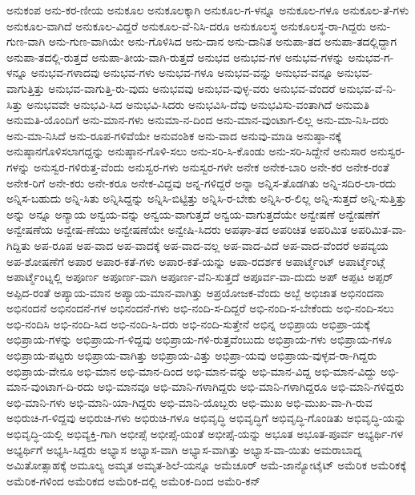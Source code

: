 {ಅನುಕಂಪ
ಅನು-ಕರ-ಣೀಯ
ಅನುಕೂಲ
ಅನುಕೂಲಕ್ಕಾಗಿ
ಅನುಕೂಲ-ಗ-ಳನ್ನೂ
ಅನುಕೂಲ-ಗಳೂ
ಅನುಕೂಲ-ತೆ-ಗಳು
ಅನುಕೂಲ-ವಾಗಿದೆ
ಅನುಕೂಲ-ವಿದ್ದರೆ
ಅನುಕೂಲ-ವೆ-ನಿಸಿ-ದರೂ
ಅನುಕೂಲಸ್ಥ
ಅನುಕೂಲಸ್ಥ-ರಾ-ಗಿದ್ದರು
ಅನು-ಗುಣ-ವಾಗಿ
ಅನು-ಗುಣ-ವಾಗಿಯೇ
ಅನು-ಗೊಳಿಸಿದ
ಅನು-ದಾನ
ಅನು-ದಾನಿತ
ಅನುಪಾ-ತದ
ಅನುಪಾ-ತದಲ್ಲಿದ್ದಾಗ
ಅನುಪಾ-ತದಲ್ಲಿ-ರುತ್ತದೆ
ಅನುಪಾ-ತೀಯ-ವಾಗಿ-ರುತ್ತದೆ
ಅನುಭವ
ಅನುಭವ-ಗಳ
ಅನುಭವ-ಗಳನ್ನು
ಅನುಭವ-ಗ-ಳನ್ನೂ
ಅನುಭವ-ಗಳಾದವು
ಅನುಭವ-ಗಳು
ಅನುಭವ-ಗಳೂ
ಅನುಭವ-ವನ್ನು
ಅನುಭವ-ವನ್ನೂ
ಅನುಭವ-ವಾಗುತ್ತಿತ್ತು
ಅನುಭವ-ವಾಗುತ್ತಿ-ರು-ವುದು
ಅನುಭವವು
ಅನುಭವ-ವುಳ್ಳ-ವರು
ಅನುಭವ-ವೆಂದರೆ
ಅನುಭವ-ವೆ-ನಿ-ಸಿತ್ತು
ಅನುಭವವೇ
ಅನುಭವಿ-ಸಿದ
ಅನುಭವಿ-ಸಿದರು
ಅನುಭವಿಸಿ-ದೆವು
ಅನುಭವಿಸು-ವಂತಾಗಿದೆ
ಅನುಮತಿ
ಅನುಮತಿ-ಯೊಂದಿಗೆ
ಅನು-ಮಾನ-ಗಳು
ಅನುಮಾ-ನ-ದಿಂದ
ಅನು-ಮಾನ-ವುಂಟಾಗ-ಲಿಲ್ಲ
ಅನು-ಮಾ-ನಿಸಿ-ದರು
ಅನು-ಮಾ-ನಿಸಿದೆ
ಅನು-ರೂಪ-ಗಳಿವೆಯೇ
ಅನುವಂಶಿಕ
ಅನು-ವಾದ
ಅನುವು-ಮಾಡಿ
ಅನುಷ್ಠಾ-ನಕ್ಕೆ
ಅನುಷ್ಠಾನಗೊಳಿಸಲಾಗದ್ದನ್ನು
ಅನುಷ್ಠಾನ-ಗೊಳಿ-ಸಲು
ಅನು-ಸರಿ-ಸಿ-ಕೊಂಡು
ಅನು-ಸರಿ-ಸಿದ್ದೇನೆ
ಅನುಸಾರ
ಅನುಸ್ವರ-ಗಳನ್ನು
ಅನುಸ್ವರ-ಗಳಿರುತ್ತ-ವೆಂದು
ಅನುಸ್ವರ-ಗಳು
ಅನುಸ್ವರ-ಗಳೇ
ಅನೇಕ
ಅನೇಕ-ಬಾರಿ
ಅನೇ-ಕರ
ಅನೇಕ-ರಂತೆ
ಅನೇಕ-ರಿಗೆ
ಅನೇ-ಕರು
ಅನೇ-ಕರೂ
ಅನೇಕ-ವಿದ್ದವು
ಅನ್ನ-ಗಳಿದ್ದರೆ
ಅನ್ನಾ
ಅನ್ನಿಸ-ತೊಡಗಿತು
ಅನ್ನಿ-ಸದಿರ-ಲಾ-ರದು
ಅನ್ನಿಸ-ಬಹುದು
ಅನ್ನಿ-ಸಿತು
ಅನ್ನಿಸಿದ್ದನ್ನು
ಅನ್ನಿಸಿ-ಬಿಟ್ಟಿತ್ತು
ಅನ್ನಿಸಿ-ರ-ಬೇಕು
ಅನ್ನಿಸಿ-ರ-ಲಿಲ್ಲ
ಅನ್ನಿ-ಸುತ್ತದೆ
ಅನ್ನಿ-ಸುತ್ತಿತ್ತು
ಅನ್ನು
ಅನ್ನೂ
ಅನ್ಯಾಯ
ಅನ್ವಯ-ವನ್ನು
ಅನ್ವಯ-ವಾಗುತ್ತದೆ
ಅನ್ವಯ-ವಾಗುತ್ತದೆಯೇ
ಅನ್ವೇಷಣೆ
ಅನ್ವೇಷಣೆಗೆ
ಅನ್ವೇಷಣೆಯ
ಅನ್ವೇಷ-ಣೆಯು
ಅನ್ವೇಷಣೆಯೇ
ಅನ್ವೇಷಿ-ಸಿದರು
ಅಪಘಾ-ತದ
ಅಪರಿಚಿತ
ಅಪರಿಮಿತ
ಅಪರಿಮಿತ-ವಾ-ಗಿದ್ದಿತು
ಅಪ-ರೂಪ
ಅಪ-ವಾದ
ಅಪ-ವಾದಕ್ಕೆ
ಅಪ-ವಾದ-ವಲ್ಲ
ಅಪ-ವಾದ-ವಿದೆ
ಅಪ-ವಾದ-ವೆಂದರೆ
ಅಪವ್ಯಯ
ಅಪ-ಶೋಷಣೆಗೆ
ಅಪಾರ
ಅಪಾರ-ಕತೆ-ಗಳು
ಅಪಾರ-ಕತೆ-ಯನ್ನು
ಅಪಾ-ರದರ್ಶಕ
ಅಪಾರ್ಟ್ಮೆಂಟ್
ಅಪಾರ್ಟ್ಮೆಂಟ್ಗೆ
ಅಪಾರ್ಟ್ಮೆಂಟ್ನಲ್ಲಿ
ಅಪೂರ್ಣ
ಅಪೂರ್ಣ-ವಾಗಿ
ಅಪೂರ್ಣ-ವೆನಿ-ಸುತ್ತದೆ
ಅಪೂರ್ವ-ವಾ-ದುದು
ಅಪ್
ಅಪ್ಪಟ
ಅಪ್ಪರ್
ಅಪ್ಪಿದ-ರಂತೆ
ಅಪ್ಯಾಯ-ಮಾನ
ಅಪ್ಯಾಯ-ಮಾನ-ವಾಗಿತ್ತು
ಅಪ್ರಯೋಜಕ-ವೆಂದು
ಅಬ್ಬೆ
ಅಭಿಜಾತ
ಅಭಿನಂದನಾ
ಅಭಿನಂದನೆ
ಅಭಿನಂದನೆ-ಗಳ
ಅಭಿನಂದನೆ-ಗಳು
ಅಭಿ-ನಂದಿ-ಸ-ದಿದ್ದರೆ
ಅಭಿ-ನಂದಿ-ಸ-ಬೇಕೆಂದು
ಅಭಿ-ನಂದಿ-ಸಲು
ಅಭಿ-ನಂದಿಸಿ
ಅಭಿ-ನಂದಿ-ಸಿದ
ಅಭಿ-ನಂದಿ-ಸಿ-ದರು
ಅಭಿ-ನಂದಿ-ಸುತ್ತೇನೆ
ಅಭಿನ್ನ
ಅಭಿಪ್ರಾಯ
ಅಭಿಪ್ರಾ-ಯಕ್ಕೆ
ಅಭಿಪ್ರಾಯ-ಗಳನ್ನು
ಅಭಿಪ್ರಾಯ-ಗ-ಳಿದ್ದವು
ಅಭಿಪ್ರಾಯ-ಗಳಿ-ರುತ್ತವೆಂಬುದು
ಅಭಿಪ್ರಾಯ-ಗಳು
ಅಭಿಪ್ರಾಯ-ಗಳೂ
ಅಭಿಪ್ರಾಯ-ಪಟ್ಟರು
ಅಭಿಪ್ರಾಯ-ವಾಗಿತ್ತು
ಅಭಿಪ್ರಾಯ-ವಿತ್ತು
ಅಭಿಪ್ರಾ-ಯವು
ಅಭಿಪ್ರಾಯ-ವುಳ್ಳವ-ರಾ-ಗಿದ್ದರು
ಅಭಿಪ್ರಾಯ-ವೇನೂ
ಅಭಿ-ಮಾನ
ಅಭಿ-ಮಾನ-ದಿಂದ
ಅಭಿ-ಮಾನ-ವನ್ನು
ಅಭಿ-ಮಾನ-ವಿದ್ದ
ಅಭಿ-ಮಾನ-ವಿದ್ದು
ಅಭಿ-ಮಾನ-ವುಂಟಾಗ-ದಿ-ರದು
ಅಭಿ-ಮಾನವೂ
ಅಭಿ-ಮಾನಿ-ಗಳಾಗಿದ್ದರು
ಅಭಿ-ಮಾನಿ-ಗಳಾಗಿದ್ದರೂ
ಅಭಿ-ಮಾನಿ-ಗಳಿದ್ದರು
ಅಭಿ-ಮಾನಿ-ಗಳು
ಅಭಿ-ಮಾನಿ-ಯಾ-ಗಿದ್ದರು
ಅಭಿ-ಮಾನಿ-ಯೊಬ್ಬರು
ಅಭಿ-ಮುಖ
ಅಭಿ-ಮುಖ-ವಾ-ಗಿ-ರುವ
ಅಭಿರುಚಿ-ಗ-ಳಿದ್ದವು
ಅಭಿರುಚಿ-ಗಳು
ಅಭಿರುಚಿ-ಗಳೂ
ಅಭಿವೃದ್ಧಿ
ಅಭಿವೃದ್ಧಿಗೆ
ಅಭಿವೃದ್ಧಿ-ಗೊಂಡಿತು
ಅಭಿವೃದ್ಧಿ-ಯನ್ನು
ಅಭಿವೃದ್ಧಿ-ಯಲ್ಲಿ
ಅಭಿವ್ಯಕ್ತಿ-ಗಾಗಿ
ಅಭೀಪ್ಸೆ
ಅಭೀಪ್ಸೆ-ಯಂತೆ
ಅಭೀಪ್ಸೆ-ಯನ್ನು
ಅಭೂತ
ಅಭೂತ-ಪೂರ್ವ
ಅಭ್ಯರ್ಥಿ-ಗಳ
ಅಭ್ಯರ್ಥಿಗೆ
ಅಭ್ಯಸಿ-ಸಿದ್ದರು
ಅಭ್ಯಾಸ
ಅಭ್ಯಾಸ-ವಾಗಿ
ಅಭ್ಯಾಸ-ವಾಗಿತ್ತು
ಅಭ್ಯಾಸ-ವಾ-ಯಿತು
ಅಮರಾಬಾದ್ನ
ಅಮಿತೋತ್ಸಾಹಕ್ಕೆ
ಅಮೂಲ್ಯ
ಅಮೃತ
ಅಮೃತ-ಶಿಲೆ-ಯನ್ನೂ
ಅಮೆಚೂರ್
ಅಮೆ-ಜಾನ್ಯೋಟೈಟ್
ಅಮೆರಿಕ
ಅಮೆರಿಕಕ್ಕೆ
ಅಮೆರಿಕ-ಗಳಿಂದ
ಅಮೆರಿಕದ
ಅಮೆರಿಕ-ದಲ್ಲಿ
ಅಮೆರಿಕ-ದಿಂದ
ಅಮೆರಿ-ಕನ್
}
